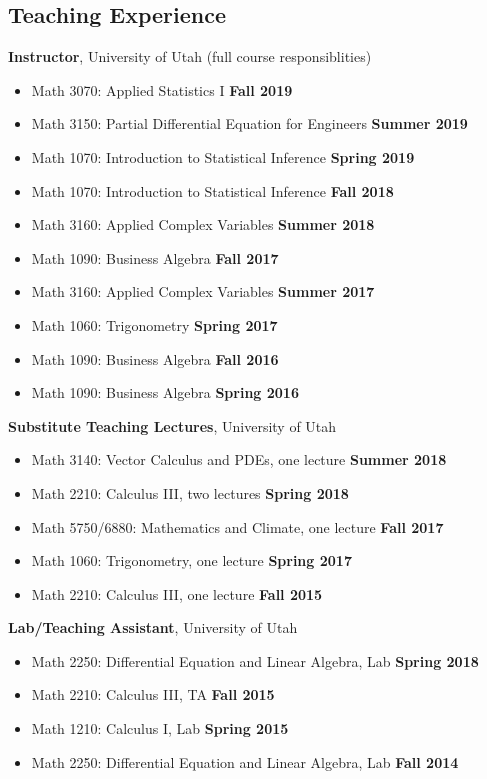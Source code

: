 \documentclass[margin,line]{res}
\begin{document}
\begin{resume}
\section{\sc Teaching Experience}
{\bf Instructor}, University of Utah (full course responsiblities)
\vspace*{.05in}
\begin{itemize}
\item[ ] Math 3070: Applied Statistics I \hfill {\bf Fall 2019}
\item[ ] Math 3150: Partial Differential Equation for Engineers \hfill {\bf Summer 2019}
\item[ ] Math 1070: Introduction to Statistical Inference \hfill {\bf Spring 2019}
\item[ ] Math 1070: Introduction to Statistical Inference \hfill {\bf Fall 2018}
\item[ ] Math 3160: Applied Complex Variables \hfill {\bf Summer 2018}
\item[ ] Math 1090: Business Algebra \hfill {\bf Fall 2017}
\item[ ] Math 3160: Applied Complex Variables \hfill {\bf Summer 2017}
\item[ ] Math 1060: Trigonometry \hfill {\bf Spring 2017}
\item[ ] Math 1090: Business Algebra \hfill {\bf Fall 2016}
\item[ ] Math 1090: Business Algebra \hfill {\bf Spring 2016}
\end{itemize}
{\bf Substitute Teaching Lectures}, University of Utah
\vspace*{.05in}
\begin{itemize}
\item[ ] Math 3140: Vector Calculus and PDEs, one lecture \hfill {\bf Summer 2018}
\item[ ] Math 2210: Calculus III, two lectures \hfill {\bf Spring 2018}
\item[ ] Math 5750/6880: Mathematics and Climate, one lecture \hfill {\bf Fall 2017}
\item[ ] Math 1060: Trigonometry, one lecture \hfill {\bf Spring 2017}
\item[ ] Math 2210: Calculus III, one lecture \hfill {\bf Fall 2015}
\end{itemize}
{\bf Lab/Teaching Assistant}, University of Utah
\vspace*{.05in}
\begin{itemize}
\item[ ] Math 2250: Differential Equation and Linear Algebra, Lab \hfill {\bf Spring 2018}
\item[ ] Math 2210: Calculus III, TA \hfill {\bf Fall 2015}
\item[ ] Math 1210: Calculus I, Lab \hfill {\bf Spring 2015}
\item[ ] Math 2250: Differential Equation and Linear Algebra, Lab \hfill {\bf Fall 2014}
\end{itemize}

\end{resume}
\end{document}

